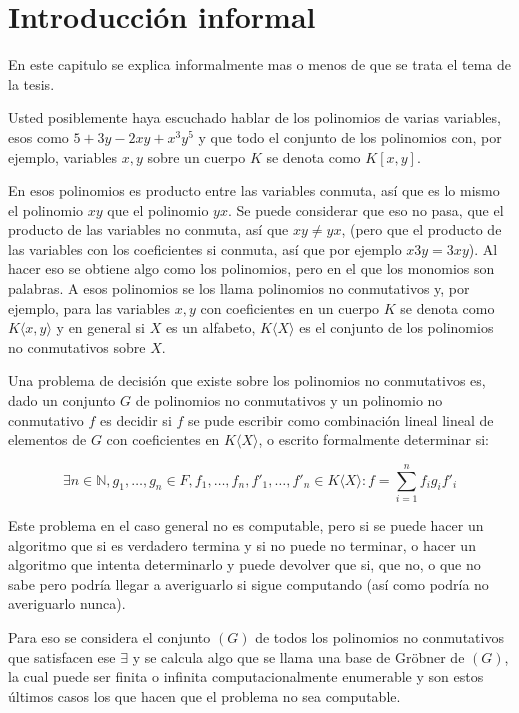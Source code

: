 \documentclass{report}
\theoremstyle{customstyle}
\theoremstyle{factstyle}
\begin{document}
\fontsize{16pt}{19pt}\selectfont %

\chapter{Introducción informal}

En este capitulo se explica informalmente mas o menos de que se trata el tema de la tesis.

Usted posiblemente haya escuchado hablar de los polinomios de varias variables, esos como $5  + 3 y - 2 x y + x^3 y^5$ y que todo el conjunto de los polinomios con, por ejemplo, variables $x, y$ sobre un cuerpo $K$ se denota como $K[x, y]$.

En esos polinomios es producto entre las variables conmuta, así que es lo mismo el polinomio $x y$ que el polinomio $y x$. Se puede considerar que eso no pasa, que el producto de las variables no conmuta, así que $x y ≠ y x$, (pero que el producto de las variables con los coeficientes si conmuta, así que por ejemplo $x 3 y = 3 x y$). Al hacer eso se obtiene algo como los polinomios, pero en el que los monomios son palabras. A esos polinomios se los llama polinomios no conmutativos y, por ejemplo, para las variables $x, y$ con coeficientes en un cuerpo $K$ se denota como $K⟨x, y⟩$ y en general si $X$ es un alfabeto, $K⟨X⟩$ es el conjunto de los polinomios no conmutativos sobre $X$.

Una problema de decisión que existe sobre los polinomios no conmutativos es, dado un conjunto $G$ de polinomios no conmutativos y un polinomio no conmutativo $f$ es decidir si $f$ se pude escribir como combinación lineal lineal de elementos de $G$ con coeficientes en $K⟨X⟩$, o escrito formalmente determinar si:

\[ ∃n ∈ ℕ, g_1, …, g_n ∈ F, f_1, …, f_n, f'_1, …, f'_n ∈ K⟨X⟩ : f = ∑_{i = 1}^n f_i g_i f'_i \]

Este problema en el caso general no es computable, pero si se puede hacer un algoritmo que si es verdadero termina y si no puede no terminar, o hacer un algoritmo que intenta determinarlo y puede devolver que si, que no, o que no sabe pero podría llegar a averiguarlo si sigue computando (así como podría no averiguarlo nunca).

Para eso se considera el conjunto $(G)$ de todos los polinomios no conmutativos que satisfacen ese $∃$ y se calcula algo que se llama una base de Gröbner de $(G)$, la cual puede ser finita o infinita computacionalmente enumerable y son estos últimos casos los que hacen que el problema no sea computable.
\end{document}
